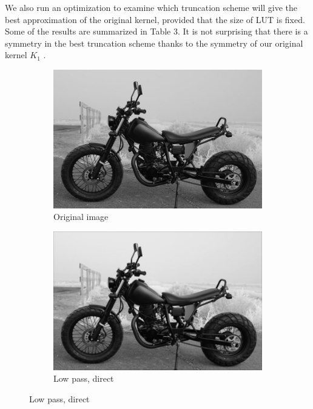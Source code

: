 \documentclass[12pt]{amsart}
\theoremstyle{definition}
\theoremstyle{remark}
\numberwithin{thm}{section}
\begin{document}
We also run an optimization to examine which truncation scheme will give the best approximation of the original kernel, provided that the size of LUT is fixed. Some of the results are summarized in Table 3. It is not surprising that there is a symmetry in the best truncation scheme thanks to the symmetry of our original kernel $K_1$ . 

\begin{figure}[h] \centering 
\begin{subfigure}[b]{0.4\textwidth} \includegraphics[width=\textwidth]{motor_original.png} \caption{Original image} %
\end{subfigure}
\begin{subfigure}[b]{0.4\textwidth} \includegraphics[width=\textwidth]{motor_direct.png} \caption{Low pass, direct}\end{subfigure}


\end{figure}
\end{document}
